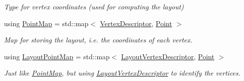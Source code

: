 \begin{DoxyCompactItemize}
\begin{DoxyCompactList}\small\item\em Type for vertex coordinates (used for computing the layout) \end{DoxyCompactList}\item 
using \hyperlink{structStateGraph_a21b31bbe893554826be5aee67ef0cab9}{Point\+Map} = std\+::map$<$ \hyperlink{structStateGraph_a95d7ea26b0d0d07d3488068a8e9be53c}{Vertex\+Descriptor}, \hyperlink{structStateGraph_acd6bb467c5261e07f777dd1c4ea575c5}{Point} $>$\hypertarget{structStateGraph_a21b31bbe893554826be5aee67ef0cab9}{}\label{structStateGraph_a21b31bbe893554826be5aee67ef0cab9}

\begin{DoxyCompactList}\small\item\em Map for storing the layout, i.\+e. the coordinates of each vertex. \end{DoxyCompactList}\item 
using \hyperlink{structStateGraph_aaeed59fc6303247c00c54a421334ac13}{Layout\+Point\+Map} = std\+::map$<$ \hyperlink{structStateGraph_addf3dd025129b447de51b59254933697}{Layout\+Vertex\+Descriptor}, \hyperlink{structStateGraph_acd6bb467c5261e07f777dd1c4ea575c5}{Point} $>$\hypertarget{structStateGraph_aaeed59fc6303247c00c54a421334ac13}{}\label{structStateGraph_aaeed59fc6303247c00c54a421334ac13}

\begin{DoxyCompactList}\small\item\em Just like \hyperlink{structStateGraph_a21b31bbe893554826be5aee67ef0cab9}{Point\+Map}, but using \hyperlink{structStateGraph_addf3dd025129b447de51b59254933697}{Layout\+Vertex\+Descriptor} to identify the vertices. \end{DoxyCompactList}\end{DoxyCompactItemize}
